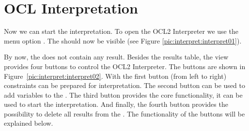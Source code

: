 \section{OCL Interpretation}

Now we can start the interpretation. To open the \acs{OCL}2 Interpreter we use the menu option . The  should now be visible (see Figure \ref{pic:interpret:interpret01}).

By now, the  does not contain any result. Besides the results table, the view provides four buttons to control the \acs{OCL}2 Interpreter. The buttons are shown in Figure~\ref{pic:interpret:interpret02}. With the first button (from left to right) constraints can be prepared for interpretation. The second button can be used to add variables to the . The third button provides the core functionality, it can be used to start the interpretation. And finally, the fourth button provides the possibility to delete all results from the . The functionality of the buttons will be explained below.

